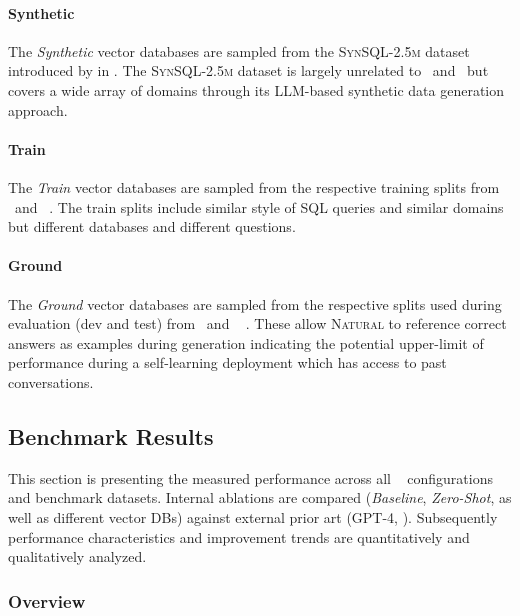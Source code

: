 \paragraph{Synthetic}

The \textit{Synthetic} vector databases are sampled from the
\textsc{SynSQL-2.5m} dataset introduced by \citeauthor{OmniSQL} in
\citeyear{OmniSQL}. The \textsc{SynSQL-2.5m} dataset is largely unrelated to
\Spider~and \Bird~but covers a wide array of domains through
its LLM-based synthetic data generation approach.

\paragraph{Train}

The \textit{Train} vector databases are sampled from the respective training
splits from \Spider~and \Bird~\citep{Spider, BIRD}. The train
splits include similar style of SQL queries and similar domains but different
databases and different questions.

\paragraph{Ground}

The \textit{Ground} vector databases are sampled from the respective splits
used during evaluation (dev and test) from \Spider~and \Bird~
\citep{Spider, BIRD}. These allow \textsc{Natural} to reference correct answers
as examples during generation indicating the potential upper-limit of
performance during a self-learning deployment which has access to past
conversations.

\subsection{Benchmark Results}

This section is presenting the measured performance across all \Natural~
configurations and benchmark datasets. Internal ablations are compared
(\textit{Baseline}, \textit{Zero-Shot}, as well as different vector DBs)
against external prior art (GPT-4, \OmniSQL). Subsequently performance
characteristics and improvement trends are quantitatively and qualitatively
analyzed.

\subsubsection{Overview}

